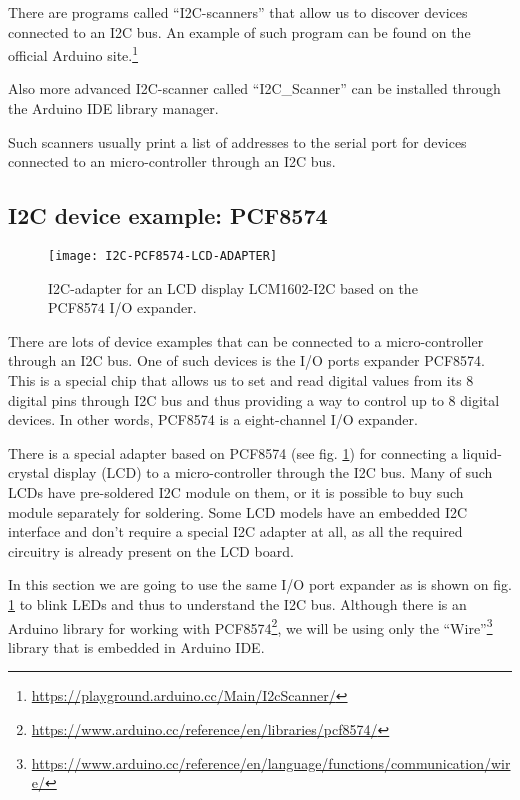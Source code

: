 \documentclass[../sparc.tex]{subfiles}
\begin{document}
There are programs called ``I2C-scanners'' that allow us to discover devices
connected to an I2C bus.  An example of such program can be found on the official Arduino site.\footnote{\url{https://playground.arduino.cc/Main/I2cScanner/}}

Also more advanced I2C-scanner called ``I2C\_Scanner'' can be installed through
the Arduino IDE library manager.

Such scanners usually print a list of addresses to the serial port for devices
connected to an micro-controller through an I2C bus.

\subsection{I2C device example: PCF8574}

\begin{figure}[H]
  \centering
  \texttt{[image: I2C-PCF8574-LCD-ADAPTER]}
  \caption{I2C-adapter for an LCD display LCM1602-I2C based on the PCF8574 I/O
    expander.}
  \label{fig:i2c-pcf8574-lcd-adapter}
\end{figure}

There are lots of device examples that can be connected to a micro-controller
through an \gls{I2C} bus.  One of such devices is the I/O ports expander
PCF8574.  This is a special chip that allows us to set and read digital values
from its 8 digital pins through I2C bus and thus providing a way to control up
to 8 digital devices.  In other words, PCF8574 is a eight-channel I/O expander.

There is a special adapter based on PCF8574 (see
fig. \ref{fig:i2c-pcf8574-lcd-adapter}) for connecting a liquid-crystal display
(LCD) to a micro-controller through the I2C bus.  Many of such LCDs have
pre-soldered I2C module on them, or it is possible to buy such module separately
for soldering.  Some LCD models have an embedded I2C interface and don't require
a special I2C adapter at all, as all the required circuitry is already present
on the LCD board.

In this section we are going to use the same I/O port expander as is shown on
fig. \ref{fig:i2c-pcf8574-lcd-adapter} to blink LEDs and thus to understand the
I2C bus.  Although there is an Arduino library for working with
PCF8574\footnote{\url{https://www.arduino.cc/reference/en/libraries/pcf8574/}},
we will be using only the
``Wire''\footnote{\url{https://www.arduino.cc/reference/en/language/functions/communication/wire/}}
library that is embedded in Arduino IDE.
\end{document}
